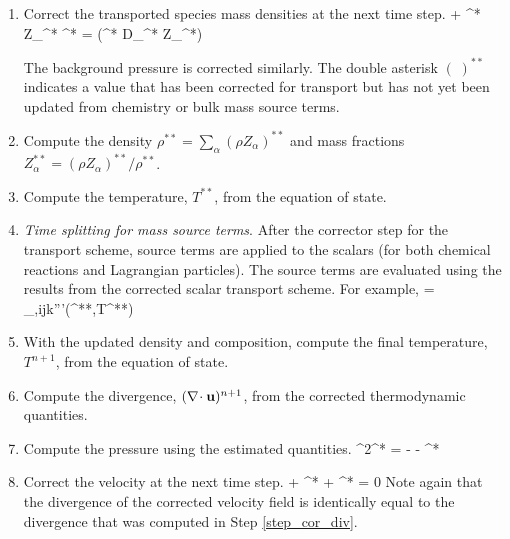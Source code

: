 \begin{enumerate}

\item Correct the transported species mass densities at the next time step.
\be
{} +  \nabla\!\cdot \rho^* Z_\alpha^* \bu^* =
\nabla\!\cdot (\rho^* D_\alpha^* \nabla Z_\alpha^*)
\ee

The background pressure is corrected similarly.  The double asterisk $(\;)^{**}$ indicates a value that has been corrected for transport but has not yet been updated from chemistry or bulk mass source terms.

\item Compute the density $\rho^{**} = \sum_\alpha (\rho Z_\alpha)^{**}$ and mass fractions $Z_\alpha^{**} = (\rho Z_\alpha)^{**}/\rho^{**}$.

\item Compute the temperature, $T^{**}$, from the equation of state.

\item \emph{Time splitting for mass source terms}. After the corrector step for the transport scheme, source terms are applied to the scalars (for both chemical reactions and Lagrangian particles).  The source terms are evaluated using the results from the corrected scalar transport scheme.  For example,
\be
{} =  \dm_{\alpha,ijk}'''(^{**},T^{**})
\ee

\item With the updated density and composition, compute the final temperature, $T^{n+1}$, from the equation of state.

\item \label{step_cor_div} Compute the divergence, $(\nabla\!\cdot {\mathbf{u}})^{n+1}$, from the corrected thermodynamic quantities.

\item Compute the pressure using the estimated quantities.
\be
\label{eqn_corrector_poisson2}
\nabla^2\cH^* = - 
   - \nabla\!\cdot {}^*
\ee

\item Correct the velocity at the next time step.
\be
{} + ^* + \nabla \cH^*  = 0
\ee
Note again that the divergence of the corrected velocity field is identically equal to the divergence that was computed in Step \ref{step_cor_div}.


\end{enumerate}
